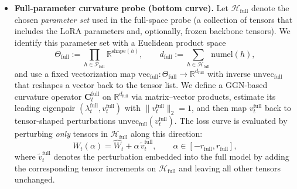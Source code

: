 \documentclass{article}
\theoremstyle{plain}
\theoremstyle{definition}
\theoremstyle{remark}
\begin{document}
\begin{itemize}
\item \textbf{Full-parameter curvature probe (bottom curve).}
Let $\mathcal H_{\mathrm{full}}$ denote the chosen \emph{parameter set} used in the full-space probe (a collection of tensors that includes the LoRA parameters and, optionally, frozen backbone tensors).
We identify this parameter set with a Euclidean product space
\[
\Theta_{\mathrm{full}}
:=
\prod_{h\in \mathcal P_{\mathrm{full}}}\mathbb R^{\mathrm{shape}(h)},
\qquad
d_{\mathrm{full}}:=\sum_{h\in \mathcal H_{\mathrm{full}}}\mathrm{numel}(h),
\]
and use a fixed vectorization map $\mathrm{vec}_{\mathrm{full}}:\Theta_{\mathrm{full}}\to\mathbb R^{d_{\mathrm{full}}}$ with inverse $\mathrm{unvec}_{\mathrm{full}}$ that reshapes a vector back to the tensor list.
We define a GGN-based curvature operator $\mathbf C_t^{\mathrm{full}}$ on $\mathbb R^{d_{\mathrm{full}}}$ via matrix--vector products, estimate its leading eigenpair $(\lambda_t^{\mathrm{full}}, v_t^{\mathrm{full}})$ with $\|v_t^{\mathrm{full}}\|_2=1$, and then map $v_t^{\mathrm{full}}$ back to tensor-shaped perturbations $\mathrm{unvec}_{\mathrm{full}}(v_t^{\mathrm{full}})$.
The loss curve is evaluated by perturbing \emph{only} tensors in $\mathcal H_{\mathrm{full}}$ along this direction:
\[
W_t(\alpha)=\widehat W_t+\alpha\, \tilde v_t^{\mathrm{full}},
\qquad \alpha\in[-r_{\mathrm{full}},r_{\mathrm{full}}],
\]
where $\tilde v_t^{\mathrm{full}}$ denotes the perturbation embedded into the full model by adding the corresponding tensor increments on $\mathcal H_{\mathrm{full}}$ and leaving all other tensors unchanged.


\end{itemize}
\end{document}
